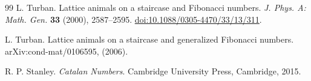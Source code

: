 \documentclass[12pt]{amsart}
\theoremstyle{plain}
\theoremstyle{definition}
\begin{document}
\begin{thebibliography}{99}
L. Turban.
\newblock Lattice animals on a staircase and Fibonacci numbers.
\newblock \emph{J. Phys. A: Math. Gen.} \textbf{33} (2000), 2587--2595.
\newblock \href{https://doi.org/10.1088/0305-4470/33/13/311}
{doi:10.1088/0305-4470/33/13/311}.

L. Turban.
\newblock Lattice animals on a staircase and generalized Fibonacci numbers.
\newblock arXiv:cond-mat/0106595, (2006).






R. P. Stanley.
\newblock \emph{Catalan Numbers}.
\newblock Cambridge University Press, Cambridge, 2015.


\end{thebibliography}
\end{document}
